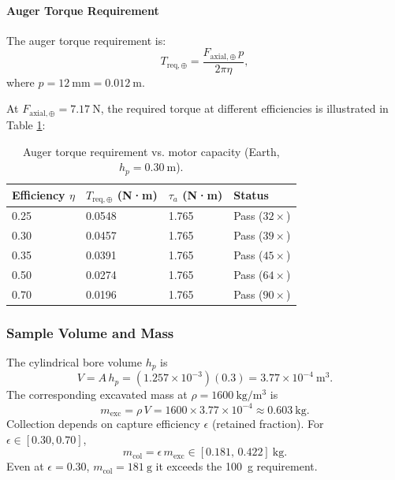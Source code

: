 \documentclass[letterpaper, 10 pt, conference]{ieeeconf}  %
\begin{document}
\paragraph{Auger Torque Requirement}

The auger torque requirement is:
\begin{equation}
    T_{\mathrm{req},\oplus} = \frac{F_{\mathrm{axial},\oplus}\,p}{2\pi \eta},
\end{equation}
where \(p=12~\mathrm{mm}=0.012~\mathrm{m}\).

At \(F_{\mathrm{axial},\oplus} = 7.17~\mathrm{N}\), the required torque at different efficiencies is illustrated in Table \ref{tab:earth_torque}:

\begin{table}[h!]
\centering
\caption{Auger torque requirement vs. motor capacity (Earth, \(h_p=0.30~\mathrm{m}\)).}
\label{tab:earth_torque}
\begin{tabular}{@{}llll@{}}
\toprule
Efficiency \(\eta\) & \(T_{\mathrm{req},\oplus}\) (N·m) & \(\tau_a\) (N·m) & Status \\
\midrule
0.25 & 0.0548 & 1.765 & Pass (\(32\times\)) \\
0.30 & 0.0457 & 1.765 & Pass (\(39\times\)) \\
0.35 & 0.0391 & 1.765 & Pass (\(45\times\)) \\
0.50 & 0.0274 & 1.765 & Pass (\(64\times\)) \\
0.70 & 0.0196 & 1.765 & Pass (\(90\times\)) \\
\bottomrule
\end{tabular}
\end{table}

\subsubsection{Sample Volume and Mass}\label{sec:samplemass}
The cylindrical bore volume  \(h_p\) is
\begin{equation}
V = A\,h_p = (1.257\times10^{-3})(0.3) = 3.77\times10^{-4}~\mathrm{m^3}. \label{eq:V}
\end{equation}
The corresponding excavated mass at \(\rho=1600~\mathrm{kg/m^3}\) is
\begin{equation}
m_{\mathrm{exc}} = \rho\,V = 1600 \times 3.77\times10^{-4} \approx 0.603~\mathrm{kg}. \label{eq:mexc}
\end{equation}
Collection depends on capture efficiency \(\epsilon\) (retained fraction). For \(\epsilon\in[0.30,0.70]\),
\begin{equation}
m_{\mathrm{col}} = \epsilon\,m_{\mathrm{exc}} \in [0.181,\,0.422]~\mathrm{kg}. \label{eq:mcol}
\end{equation}
Even at \(\epsilon=0.30\), \(m_{\mathrm{col}}=181~\mathrm{g}\) it exceeds the 100~g requirement.
\end{document}
